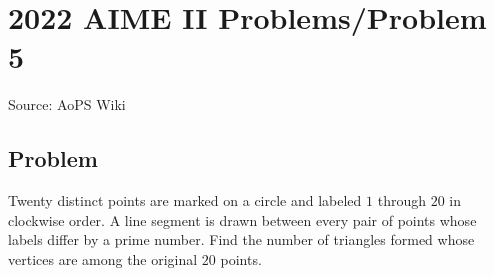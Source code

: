 \documentclass[12pt]{article}
\begin{document}
\section*{{2022 AIME II Problems/Problem 5}}
Source: AoPS Wiki

\subsection*{Problem}
Twenty distinct points are marked on a circle and labeled $1$ through $20$ in clockwise order. A line segment is drawn between every pair of points whose labels differ by a prime number. Find the number of triangles formed whose vertices are among the original $20$ points.
\end{document}
